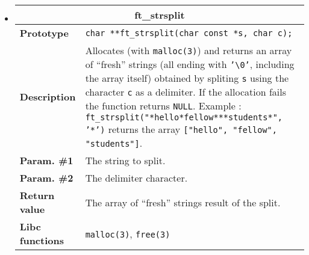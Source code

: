 \documentclass{42-en}
\begin{document}
\begin{itemize}
            \item \begin{tabular}{|l|p{11cm}|}
                \hline
                \multicolumn{2}{|c|}{\textbf{ft\_strsplit}}\\
                \hline
                \textbf{Prototype} &
                \texttt{char **\hspace{5mm}ft\_strsplit(char const *s,
                  char c);}\\
                \hline
                \textbf{Description} & Allocates (with
                \texttt{malloc(3)}) and returns an array of ``fresh''
                strings (all ending with \texttt{'\textbackslash{}0'}, including
                the array itself) obtained by spliting \texttt{s} using
                the character \texttt{c} as a delimiter. If the allocation fails the
                function returns \texttt{NULL}. Example :
                \texttt{ft\_strsplit("*hello*fellow***students*", '*')}
                returns the array \texttt{["hello", "fellow",
                    "students"]}.\\
                \hline
                \textbf{Param. \#1} & The string to split.\\
                \hline
                \textbf{Param. \#2} & The delimiter character.\\
                \hline
                \textbf{Return value} & The array of ``fresh'' strings
                result of the split.\\
                \hline
                \textbf{Libc functions} & \texttt{malloc(3)},
                \texttt{free(3)}\\
                \hline
            \end{tabular}


\end{itemize}
\end{document}
